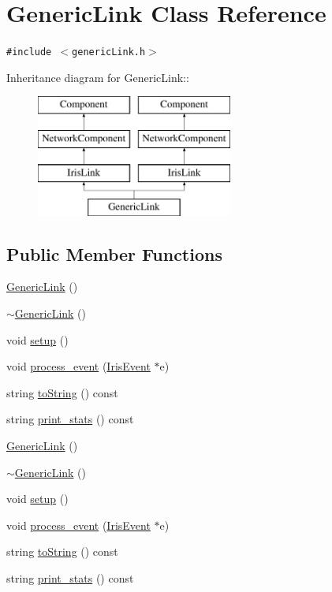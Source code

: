 \hypertarget{classGenericLink}{
\section{GenericLink Class Reference}
\label{classGenericLink}
}
{\tt \#include $<$genericLink.h$>$}

Inheritance diagram for GenericLink::\begin{figure}[H]
\begin{center}
\leavevmode
\includegraphics[height=4cm]{classGenericLink}
\end{center}
\end{figure}
\subsection*{Public Member Functions}
\begin{CompactItemize}
\item 
\hyperlink{classGenericLink_228314904a07730170bfe994177f33b4}{GenericLink} ()
\item 
\hyperlink{classGenericLink_c67cbdcd115d4e41db4c379119bfdcc4}{$\sim$GenericLink} ()
\item 
void \hyperlink{classGenericLink_8afec492b9c0a403462c2cf1001adc77}{setup} ()
\item 
void \hyperlink{classGenericLink_c09533f8445eb3c550c744fd4ada7324}{process\_\-event} (\hyperlink{classIrisEvent}{IrisEvent} $\ast$e)
\item 
string \hyperlink{classGenericLink_64dad2c98848fb48b3b572887031167b}{toString} () const 
\item 
string \hyperlink{classGenericLink_10ccb365b945b9ad7ea3b49c68069d41}{print\_\-stats} () const 
\item 
\hyperlink{classGenericLink_228314904a07730170bfe994177f33b4}{GenericLink} ()
\item 
\hyperlink{classGenericLink_c67cbdcd115d4e41db4c379119bfdcc4}{$\sim$GenericLink} ()
\item 
void \hyperlink{classGenericLink_8afec492b9c0a403462c2cf1001adc77}{setup} ()
\item 
void \hyperlink{classGenericLink_c09533f8445eb3c550c744fd4ada7324}{process\_\-event} (\hyperlink{classIrisEvent}{IrisEvent} $\ast$e)
\item 
string \hyperlink{classGenericLink_64dad2c98848fb48b3b572887031167b}{toString} () const 
\item 
string \hyperlink{classGenericLink_10ccb365b945b9ad7ea3b49c68069d41}{print\_\-stats} () const 
\end{CompactItemize}
